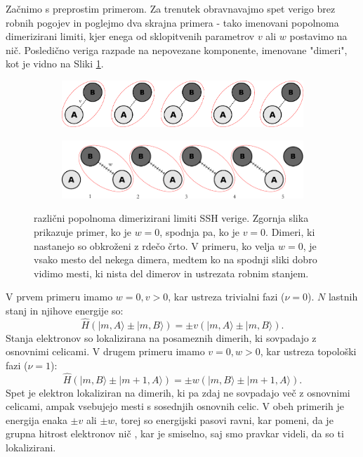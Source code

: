 Začnimo s preprostim primerom. Za trenutek obravnavajmo spet verigo brez robnih pogojev in poglejmo dva skrajna primera - tako imenovani popolnoma dimerizirani limiti, kjer enega od sklopitvenih parametrov $v$ ali $w$ postavimo na nič. Posledično veriga razpade na nepovezane komponente, imenovane "dimeri", kot je vidno na Sliki \ref{fig:dimerized}.

\begin{figure}[H]
\centering
\begin{subfigure}{.9\textwidth}
\includegraphics[width=\linewidth]{Figures/MyDimerized1.pdf}
\end{subfigure}
\begin{subfigure}{.9\textwidth}
\includegraphics[width=\linewidth]{Figures/MyDimerized2.pdf}
\end{subfigure}
\caption{različni popolnoma dimerizirani limiti SSH verige. Zgornja slika prikazuje primer, ko je $w=0$, spodnja pa, ko je $v=0$. Dimeri, ki nastanejo so obkroženi z rdečo črto. V primeru, ko velja $w=0$, je vsako mesto del nekega dimera, medtem ko na spodnji sliki dobro vidimo mesti, ki nista del dimerov in ustrezata robnim stanjem.}
\label{fig:dimerized}
\end{figure}

V prvem primeru imamo $w=0, v > 0$, kar ustreza trivialni fazi ($\nu=0$). $N$ lastnih stanj in njihove energije so:
\begin{equation}
\hat{H} ( |m, A \rangle \pm | m , B \rangle) = \pm v( |m, A \rangle \pm | m, B \rangle ).
\end{equation}
Stanja elektronov so lokalizirana na posameznih dimerih, ki sovpadajo z osnovnimi celicami.
V drugem primeru imamo $v=0, w>0$, kar ustreza topološki fazi ($\nu = 1$):
\begin{equation}
\hat{H} ( |m, B \rangle \pm | m + 1 , A \rangle) = \pm w( |m, B \rangle \pm | m+1,A \rangle ).
\end{equation}
Spet je elektron lokaliziran na dimerih, ki pa zdaj ne sovpadajo več z osnovnimi celicami, ampak vsebujejo mesti s sosednjih osnovnih celic.
V obeh primerih je energija enaka $\pm v$ ali $\pm w$, torej so energijski pasovi ravni, kar pomeni, da je grupna hitrost elektronov nič \cite{ashcroft}, kar je smiselno, saj smo pravkar videli, da so ti lokalizirani.

